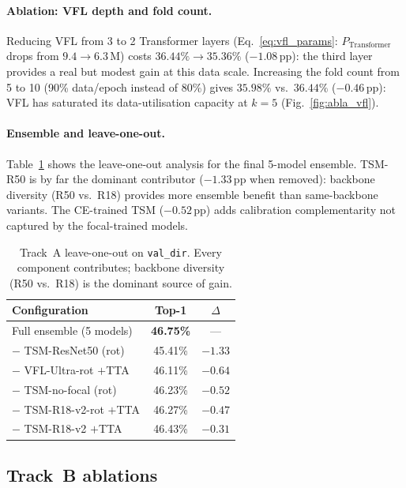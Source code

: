 \documentclass[10pt,twocolumn,letterpaper]{article}
\begin{document}
\paragraph{Ablation: VFL depth and fold count.}
Reducing VFL from 3 to 2 Transformer layers (Eq.~\eqref{eq:vfl_params}:
$P_\text{Transformer}$ drops from $9.4\!\rightarrow\!6.3$\,M) costs
$36.44\%\!\rightarrow\!35.36\%$ ($-1.08$\,pp): the third layer provides a
real but modest gain at this data scale. Increasing the fold count from 5 to 10
(90\% data/epoch instead of 80\%) gives $35.98\%$ vs.\ $36.44\%$ ($-0.46$\,pp):
VFL has saturated its data-utilisation capacity at $k{=}5$
(Fig.~\ref{fig:abla_vfl}).

\paragraph{Ensemble and leave-one-out.}
Table~\ref{tab:loo} shows the leave-one-out analysis for the final 5-model
ensemble. TSM-R50 is by far the dominant contributor ($-1.33$\,pp when removed):
backbone diversity (R50 vs.\ R18) provides more ensemble benefit than
same-backbone variants. The CE-trained TSM ($-0.52$\,pp) adds calibration
complementarity not captured by the focal-trained models.

\begin{table}[t]
\centering\small
\begin{tabular}{@{}lcc@{}}
\toprule
Configuration & Top-1 & $\Delta$ \\
\midrule
Full ensemble (5 models)             & \textbf{46.75\%} & --- \\
\;$-$ TSM-ResNet50 (rot)             & 45.41\% & $-1.33$ \\
\;$-$ VFL-Ultra-rot $+$TTA           & 46.11\% & $-0.64$ \\
\;$-$ TSM-no-focal (rot)             & 46.23\% & $-0.52$ \\
\;$-$ TSM-R18-v2-rot $+$TTA          & 46.27\% & $-0.47$ \\
\;$-$ TSM-R18-v2 $+$TTA              & 46.43\% & $-0.31$ \\
\bottomrule
\end{tabular}
\caption{Track~A leave-one-out on \texttt{val\_dir}. Every component contributes;
backbone diversity (R50 vs.\ R18) is the dominant source of gain.}
\label{tab:loo}
\end{table}

\subsection{Track~B ablations}
\end{document}
